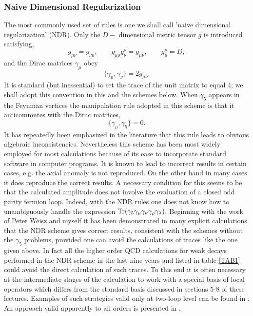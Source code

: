 \documentclass[12pt]{article}
\def\ga{\gamma}
\newcommand{\be}{\begin{equation}}
\newcommand{\ee}{\end{equation}}
\begin{document}
\begin{itemize}
\subsubsection{Naive Dimensional Regularization}
  The most commonly used set of rules is one we shall call 'naive dimensional
 regularization' (NDR).
 Only the $D-$ dimensional metric tensor $g$ is introduced satisfying,
\be\label{BW1}
 g_{\mu \nu} = g_{\nu \mu}, \qquad
 g_{\mu \rho} g^{\rho}_{\nu} = g_{\mu \nu}, \qquad
 g_{\mu}^{\mu} = D, 
\ee
 and the Dirac matrices $\gamma_{\mu}$ obey
\be\label{BW2}
 \{ \ga_{\mu} , \ga_{\nu} \} = 2 g_{\mu \nu}.
\ee
 It is standard (but inessential) to set the trace of the unit matrix
 to equal 4; we shall adopt this convention in this and the schemes below.
 When $\gamma_5$ appears in the Feynman vertices
 the manipulation rule adopted in this scheme is that it
 anticommutes with the Dirac matrices,
\be\label{BW3}
 \{ \ga_{\mu} , \gamma_5 \} = 0.
\ee
 It has repeatedly been emphasized in the literature \cite{BM,Bo}
 that this rule leads to obvious algebraic inconsistencies.
 Nevertheless this scheme has been most widely employed for most calculations
 because of its ease to incorporate standard software in computer programs.
 It is known to lead to incorrect results in certain cases, e.g. the axial
 anomaly is not reproduced. On the other hand in many cases
 it does reproduce the correct
 results. A necessary condition for this
 seems to be that the calculated amplitude does not involve the evaluation
 of a closed odd parity
 fermion loop. Indeed, with the NDR rules one does not know
 how to unambiguously handle the expression
$ 
{\rm Tr}(\gamma_5 \gamma_{\mu} \gamma_{\nu} \gamma_{\rho} \gamma_{\lambda}).
$
Beginning with the work of Peter Weisz and myself \cite{WEISZ} it has
been demonstrated in many explicit calculations that the NDR scheme
gives correct results, consistent with the schemes without the $\gamma_5$
problems, provided one can avoid the calculations of traces like the
one given above. In fact all the higher order QCD calculations for weak
decays performed
in the NDR scheme in the last nine years and listed in table 
\ref{TAB1} could
avoid the direct calculation of such traces. To this end 
it is often necessary at the
intermediate stages of the calculation 
to work with a special basis of local operators which differs from
the standard basis discussed in sections 5-8 of these lectures.
Examples of such strategies valid only at two-loop level can be
found in \cite{BJLW1,BJLW2,CURCI}. 
An approach valid apparently to all orders is presented
in \cite{MISTRIK}.


\end{itemize}
\end{document}
